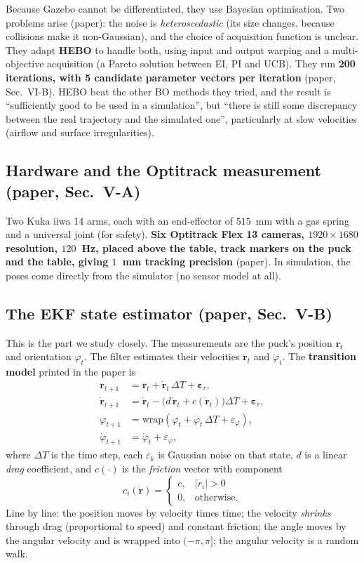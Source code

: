 \documentclass[11pt,a4paper]{article}
\begin{document}
Because Gazebo cannot be differentiated, they use Bayesian optimisation. Two problems arise
(paper): the noise is \emph{heteroscedastic} (its size changes, because collisions make it
non-Gaussian), and the choice of acquisition function is unclear. They adapt \textbf{HEBO} to handle
both, using input and output warping and a multi-objective acquisition (a Pareto solution between
EI, PI and UCB). They run \textbf{200 iterations, with 5 candidate parameter vectors per iteration}
(paper, Sec.~VI-B). HEBO beat the other BO methods they tried, and the result is ``sufficiently good
to be used in a simulation'', but ``there is still some discrepancy between the real trajectory and
the simulated one'', particularly at slow velocities (airflow and surface irregularities).

\subsection{Hardware and the Optitrack measurement (paper, Sec.~V-A)}
Two Kuka iiwa 14 arms, each with an end-effector of $515$~mm with a gas spring and a universal
joint (for safety). \textbf{Six Optitrack Flex 13 cameras, $1920\times1680$ resolution, $120$~Hz,
placed above the table, track markers on the puck and the table, giving $1$~mm tracking precision}
(paper). In simulation, the poses come directly from the simulator (no sensor model at all).

\subsection{The EKF state estimator (paper, Sec.~V-B)}
\label{sec:ekf}
This is the part we study closely. The measurements are the puck's position $\bm r_t$ and
orientation $\varphi_t$. The filter estimates their velocities $\dot{\bm r}_t$ and $\dot\varphi_t$.
The \textbf{transition model} printed in the paper is
\begin{align*}
\bm r_{t+1}&=\bm r_t+\dot{\bm r}_t\,\Delta T+\bm\varepsilon_r,\\
\dot{\bm r}_{t+1}&=\dot{\bm r}_t-\bigl(d\,\dot{\bm r}_t+c(\dot{\bm r}_t)\bigr)\Delta T+\bm\varepsilon_{\dot r},\\
\varphi_{t+1}&=\mathrm{wrap}(\varphi_t+\dot\varphi_t\,\Delta T+\varepsilon_\varphi),\\
\dot\varphi_{t+1}&=\dot\varphi_t+\varepsilon_{\dot\varphi},
\end{align*}
where $\Delta T$ is the time step, each $\varepsilon_k$ is Gaussian noise on that state, $d$ is a
linear \emph{drag} coefficient, and $c(\cdot)$ is the \emph{friction} vector with component
\[
c_i(\dot{\bm r})=\begin{cases}c,&|\dot r_i|>0\\0,&\text{otherwise.}\end{cases}
\]
Line by line: the position moves by velocity times time; the velocity \emph{shrinks} through drag
(proportional to speed) and constant friction; the angle moves by the angular velocity and is
wrapped into $(-\pi,\pi]$; the angular velocity is a random walk.
\end{document}
